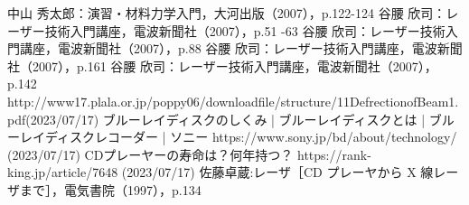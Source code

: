 \documentclass[a4paper,11pt]{jsarticle}
\begin{document}
\begin{thebibliography}{20}
  \bibitem{}
  中山 秀太郎：演習・材料力学入門，大河出版（2007），p.122-124
  \bibitem{}
  谷腰 欣司：レーザー技術入門講座，電波新聞社（2007），p.51 -63
  \bibitem{}
  谷腰 欣司：レーザー技術入門講座，電波新聞社（2007），p.88
  \bibitem{}
  谷腰 欣司：レーザー技術入門講座，電波新聞社（2007），p.161
  \bibitem{}
  谷腰 欣司：レーザー技術入門講座，電波新聞社（2007），p.142
  \bibitem{}
  http://www17.plala.or.jp/poppy06/downloadfile/structure/11DefrectionofBeam1.pdf(2023/07/17)
  \bibitem{}
  ブルーレイディスクのしくみ | ブルーレイディスクとは | ブルーレイディスクレコーダー | ソニー https://www.sony.jp/bd/about/technology/ (2023/07/17)
  \bibitem{}
  CDプレーヤーの寿命は？何年持つ？ https://rank-king.jp/article/7648 (2023/07/17)
  \bibitem{}
  佐藤卓蔵:レーザ［CD プレーヤから X 線レーザまで］，電気書院（1997），p.134
\end{thebibliography}
\end{document}
